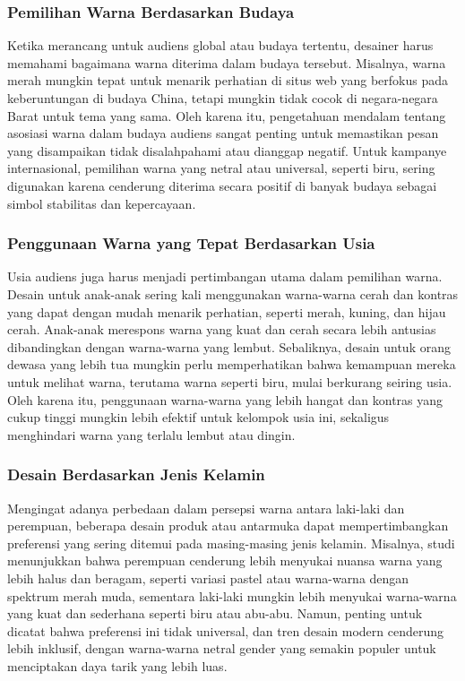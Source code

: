 \documentclass[a4paper]{article}
\begin{document}
\subsubsection{Pemilihan Warna Berdasarkan Budaya}
Ketika merancang untuk audiens global atau budaya tertentu, desainer harus memahami bagaimana warna diterima dalam budaya tersebut. Misalnya, warna merah mungkin tepat untuk menarik perhatian di situs web yang berfokus pada keberuntungan di budaya China, tetapi mungkin tidak cocok di negara-negara Barat untuk tema yang sama. Oleh karena itu, pengetahuan mendalam tentang asosiasi warna dalam budaya audiens sangat penting untuk memastikan pesan yang disampaikan tidak disalahpahami atau dianggap negatif. Untuk kampanye internasional, pemilihan warna yang netral atau universal, seperti biru, sering digunakan karena cenderung diterima secara positif di banyak budaya sebagai simbol stabilitas dan kepercayaan.

\subsubsection{Penggunaan Warna yang Tepat Berdasarkan Usia}
Usia audiens juga harus menjadi pertimbangan utama dalam pemilihan warna. Desain untuk anak-anak sering kali menggunakan warna-warna cerah dan kontras yang dapat dengan mudah menarik perhatian, seperti merah, kuning, dan hijau cerah. Anak-anak merespons warna yang kuat dan cerah secara lebih antusias dibandingkan dengan warna-warna yang lembut. Sebaliknya, desain untuk orang dewasa yang lebih tua mungkin perlu memperhatikan bahwa kemampuan mereka untuk melihat warna, terutama warna seperti biru, mulai berkurang seiring usia. Oleh karena itu, penggunaan warna-warna yang lebih hangat dan kontras yang cukup tinggi mungkin lebih efektif untuk kelompok usia ini, sekaligus menghindari warna yang terlalu lembut atau dingin.


\subsubsection{Desain Berdasarkan Jenis Kelamin}
Mengingat adanya perbedaan dalam persepsi warna antara laki-laki dan perempuan, beberapa desain produk atau antarmuka dapat mempertimbangkan preferensi yang sering ditemui pada masing-masing jenis kelamin. Misalnya, studi menunjukkan bahwa perempuan cenderung lebih menyukai nuansa warna yang lebih halus dan beragam, seperti variasi pastel atau warna-warna dengan spektrum merah muda, sementara laki-laki mungkin lebih menyukai warna-warna yang kuat dan sederhana seperti biru atau abu-abu. Namun, penting untuk dicatat bahwa preferensi ini tidak universal, dan tren desain modern cenderung lebih inklusif, dengan warna-warna netral gender yang semakin populer untuk menciptakan daya tarik yang lebih luas.
\end{document}

